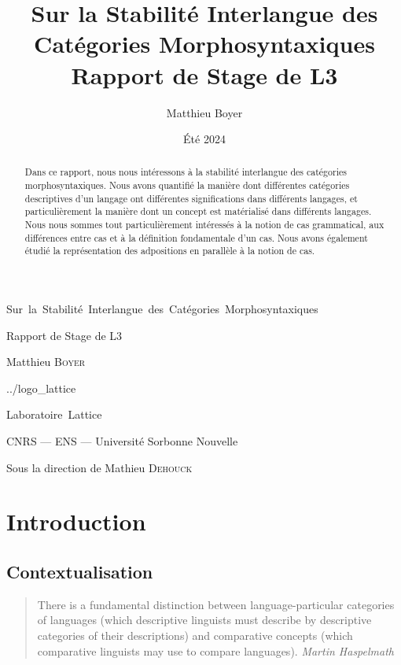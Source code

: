 \documentclass{cours}
\title{Sur la Stabilité Interlangue des Catégories Morphosyntaxiques\\[2pt]\small Rapport de Stage de L3}
\author{Matthieu Boyer}
\date{Été 2024}
\begin{document}
\titlepage %
	{}
        {\centering %
		{\Huge Sur\, la\, Stabilité\, Interlangue\, des\, Catégories\, Morphosyntaxiques\par}
                \vspace{16pt}
                {\Large Rapport de Stage de L3\par}
                \vspace{24pt}
                {\huge Matthieu \textsc{Boyer}\par}}
	{../logo_lattice}
	{\centering %
                {\huge\sc Laboratoire\, Lattice \par}
                \vspace{16pt}
                {\large \sc CNRS --- ENS --- Université Sorbonne Nouvelle\par}
                \vspace{24pt}
		{\Large Sous la direction de Mathieu \textsc{Dehouck}\par}}

\tableofcontents

\begin{abstract}
Dans ce rapport, nous nous intéressons à la stabilité interlangue des catégories morphosyntaxiques.
Nous avons quantifié la manière dont différentes catégories descriptives d'un langage ont différentes significations dans différents langages, et particulièrement la manière dont un concept est matérialisé dans différents langages.
Nous nous sommes tout particulièrement intéressés à la notion de cas grammatical, aux différences entre cas et à la définition fondamentale d'un cas. Nous avons également étudié la représentation des adpositions en parallèle à la notion de cas.
\end{abstract}


\section{Introduction}\label{sec:introduction}
\subsection{Contextualisation}\label{subsec:contextualisation}
\begin{quote}
	There is a fundamental distinction between language-particular categories of languages (which descriptive linguists must describe by descriptive categories of their descriptions) and comparative concepts (which comparative linguists may use to compare languages).
	{\flushright \textit{Martin Haspelmath} \cite{Has18}}
\end{quote}
\end{document}
